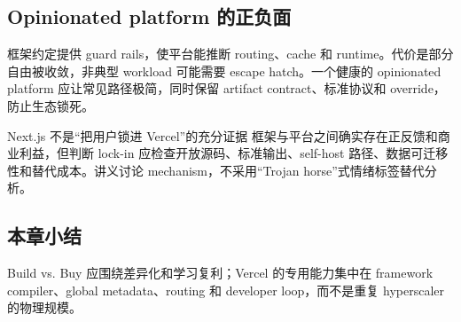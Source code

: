 \subsection{Opinionated platform 的正负面}

框架约定提供 guard rails，使平台能推断 routing、cache 和 runtime。代价是部分自由被收敛，非典型 workload 可能需要 escape hatch。一个健康的 opinionated platform 应让常见路径极简，同时保留 artifact contract、标准协议和 override，防止生态锁死。


\begin{warningbox}{Next.js 不是“把用户锁进 Vercel”的充分证据}
框架与平台之间确实存在正反馈和商业利益，但判断 lock-in 应检查开放源码、标准输出、self-host 路径、数据可迁移性和替代成本。讲义讨论 mechanism，不采用“Trojan horse”式情绪标签替代分析。
\end{warningbox}


\subsection{本章小结}

Build vs. Buy 应围绕差异化和学习复利；Vercel 的专用能力集中在 framework compiler、global metadata、routing 和 developer loop，而不是重复 hyperscaler 的物理规模。

